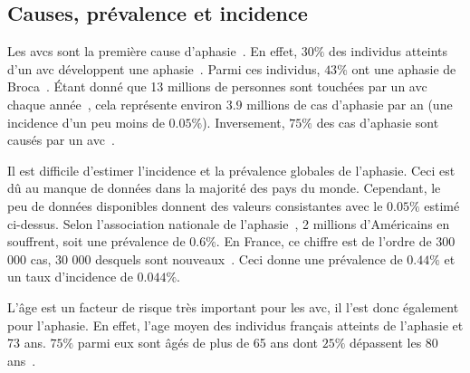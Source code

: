 \subsection{Causes, prévalence et incidence}

Les \glspl{avc} sont la première cause d'aphasie~\cite{Hallowell_2017}.
En effet, \(30\%\) des individus atteints d'un \gls{avc} 
développent une aphasie~\cite{Flowers_Skoretz_Silver_Rochon_Fang_Flamand-Roze_Martino_2016}.
Parmi ces individus, \(43\%\) ont une aphasie de Broca~\cite{CNSA_2015}.
Étant donné que 13 millions de personnes sont touchées par un \gls{avc} 
chaque année~\cite{Smaili_Langlois_Pribil_2022},
cela représente environ \(3.9\) millions de cas d'aphasie par an (une incidence d'un peu moins de \(0.05\%\)).
Inversement, \(75\%\) des cas d'aphasie sont causés par un \gls{avc}~\cite{CNSA_2015}.

Il est difficile d'estimer l'incidence et la prévalence globales de l'aphasie.
Ceci est dû au manque de données dans la majorité des pays du monde.
Cependant, le peu de données disponibles donnent des valeurs consistantes avec le \(0.05\%\) estimé ci-dessus.
Selon l'association nationale de l'aphasie~\cite{Home}, 2 millions d'Américains en souffrent, 
soit une prévalence de \(0.6\%\).
En France, ce chiffre est de l'ordre de 300 000 cas, 30 000 desquels sont nouveaux~\cite{CNSA_2015}.
Ceci donne une prévalence de \(0.44\%\) et un taux d'incidence de \(0.044\%\).

L'âge est un facteur de risque très important pour les \gls{avc},
il l'est donc également pour l'aphasie. 
En effet, l'age moyen des individus français atteints de l'aphasie et 73 ans.
\(75\%\) parmi eux sont âgés de plus de 65 ans dont \(25\%\) dépassent les 80 ans~\cite{CNSA_2015}.






